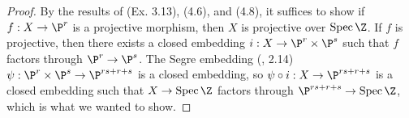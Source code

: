 \documentclass[a4paper]{article}
\begin{document}
\begin{enumerate} [label=\textbf{\arabic*.}, leftmargin=0em]
\begin{proof}
    By the results of (Ex. 3.13), (4.6), and (4.8), it suffices to show if $f : X \to \P^r$ is a projective morphism, then $X$ is projective over $\spec{\Z}$.
    If $f$ is projective, then there exists a closed embedding $i : X \to \P^r \times \P^s$ such that $f$ factors through $\P^r \to \P^s$.
    The Segre embedding (, 2.14) $\psi : \P^r \times \P^s \to \P^{rs + r + s}$ is a closed embedding, so $\psi \circ i : X \to \P^{rs + r + s}$ is a closed embedding such that $X \to \spec{\Z}$ factors through $\P^{rs + r + s} \to \spec{\Z}$, which is what we wanted to show.
\end{proof}

\end{enumerate}
\end{document}

